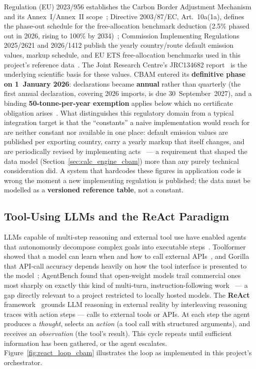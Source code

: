 Regulation (EU) 2023/956 establishes the Carbon Border Adjustment
Mechanism and its Annex~I/Annex~II scope~\cite{eu2023956}; Directive
2003/87/EC, Art.~10a(1a), defines the phase-out schedule for the
free-allocation benchmark deduction (2.5\% phased out in 2026, rising to
100\% by 2034)~\cite{eudirective200387ec}; Commission Implementing
Regulations 2025/2621 and 2026/1412 publish the yearly country/route
default emission values, markup schedule, and EU ETS free-allocation
benchmarks used in this project's reference data~\cite{eu20252621,eu20261412}.
The Joint Research Centre's JRC134682 report~\cite{jrc134682} is the
underlying scientific basis for these values. CBAM entered its
\textbf{definitive phase on 1~January 2026}: declarations became
\textbf{annual} rather than quarterly (the first annual declaration,
covering 2026 imports, is due 30~September~2027), and a binding
\textbf{50-tonne-per-year exemption} applies below which no certificate
obligation arises~\cite{eu2023956}. What distinguishes this regulatory
domain from a typical integration target is that the ``constants'' a
naive implementation would reach for are neither constant nor available
in one place: default emission values are published per exporting
country, carry a yearly markup that itself changes, and are periodically
revised by implementing acts~\cite{eu20252621} --- a requirement that
shaped the data model (Section~\ref{sec:calc_engine_cbam}) more than any
purely technical consideration did. A system that hardcodes these figures
in application code is wrong the moment a new implementing regulation is
published; the data must be modelled as a \textbf{versioned reference
table}, not a constant.

\subsection{Tool-Using LLMs and the ReAct Paradigm}
\label{sec:react_paradigm_cbam}

LLMs capable of multi-step reasoning and external tool use have enabled
agents that autonomously decompose complex goals into executable
steps~\cite{russell2020ai,wang2023agentsurvey}. Toolformer showed that a
model can learn when and how to call external APIs~\cite{schick2023toolformer},
and Gorilla that API-call accuracy depends heavily on how the tool
interface is presented to the model~\cite{patil2023gorilla}; AgentBench
found that open-weight models trail commercial ones most sharply on
exactly this kind of multi-turn, instruction-following
work~\cite{liu2024agentbench} --- a gap directly relevant to a project
restricted to locally hosted models. The \textbf{ReAct} framework~\cite{yao2022react}
grounds LLM reasoning in external reality by interleaving reasoning traces
with action steps --- calls to external tools or APIs. At each step the
agent produces a \textit{thought}, selects an \textit{action} (a tool call
with structured arguments), and receives an \textit{observation} (the
tool's result). This cycle repeats until sufficient information has been
gathered, or the agent escalates. Figure~\ref{fig:react_loop_cbam}
illustrates the loop as implemented in this project's orchestrator.

